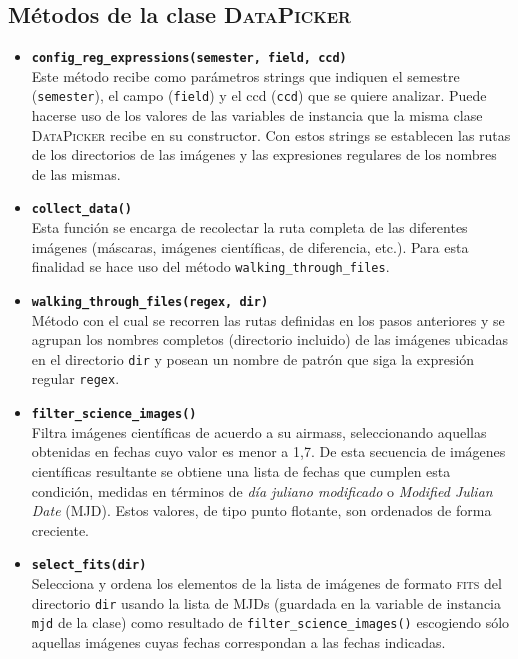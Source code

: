 \begin{appendix}
\section{M\'etodos de la clase \textsc{DataPicker}}
\label{subs:a2}

\begin{itemize}
\item \textbf{\texttt{config\_reg\_expressions(semester, field, ccd)}}\\
Este m\'etodo recibe como par\'ametros strings que indiquen el semestre (\texttt{semester}), el campo (\texttt{field}) y el ccd (\texttt{ccd}) que se quiere analizar. Puede hacerse uso de los valores de las variables de instancia que la misma clase \textsc{DataPicker} recibe en su constructor. Con estos strings se establecen las rutas de los directorios de las im\'agenes y las expresiones regulares de los nombres de las mismas.
\bigskip

\item \textbf{\texttt{collect\_data()}}\\
Esta funci\'on se encarga de recolectar la ruta completa de las diferentes im\'agenes (m\'ascaras, im\'agenes cient\'ificas, de diferencia, etc.). Para esta finalidad se hace uso del m\'etodo \texttt{walking\_through\_files}. 
\bigskip

\item \textbf{\texttt{walking\_through\_files(regex, dir)}}\\
M\'etodo con el cual se recorren las rutas definidas en los pasos anteriores y se agrupan los nombres completos (directorio incluido) de las im\'agenes ubicadas en el directorio \texttt{dir} y posean un nombre de patr\'on que siga la expresi\'on regular \texttt{regex}.
\bigskip

\item \textbf{\texttt{filter\_science\_images()}}\\
Filtra im\'agenes cient\'ificas de acuerdo a su \gls{airmass}, seleccionando aquellas obtenidas en fechas cuyo valor es menor a 1,7. De esta secuencia de im\'agenes cient\'ificas resultante se obtiene una lista de fechas que cumplen esta condici\'on, medidas en t\'erminos de \textit{d\'ia juliano modificado} o \textit{Modified Julian Date} (MJD). Estos valores, de tipo punto flotante, son ordenados de forma creciente.
\bigskip

\item \textbf{\texttt{select\_fits(dir)}}\\
Selecciona y ordena los elementos de la lista de im\'agenes de formato \textsc{fits} del directorio \texttt{dir} usando la lista de MJDs (guardada en la variable de instancia \texttt{mjd} de la clase) como resultado de \texttt{filter\_science\_images()} escogiendo s\'olo aquellas im\'agenes cuyas fechas correspondan a las fechas indicadas.
\bigskip


\end{itemize}
\end{appendix}
